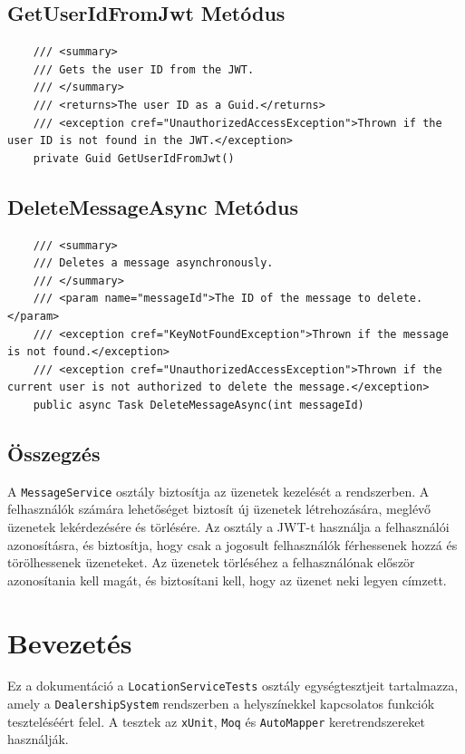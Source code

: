 \documentclass{report}[11pt]
\begin{document}
\subsection*{GetUserIdFromJwt Metódus}
\begin{lstlisting}
    /// <summary>
    /// Gets the user ID from the JWT.
    /// </summary>
    /// <returns>The user ID as a Guid.</returns>
    /// <exception cref="UnauthorizedAccessException">Thrown if the user ID is not found in the JWT.</exception>
    private Guid GetUserIdFromJwt()
\end{lstlisting}

\subsection*{DeleteMessageAsync Metódus}
\begin{lstlisting}
    /// <summary>
    /// Deletes a message asynchronously.
    /// </summary>
    /// <param name="messageId">The ID of the message to delete.</param>
    /// <exception cref="KeyNotFoundException">Thrown if the message is not found.</exception>
    /// <exception cref="UnauthorizedAccessException">Thrown if the current user is not authorized to delete the message.</exception>
    public async Task DeleteMessageAsync(int messageId)
\end{lstlisting}

\subsection*{Összegzés}
A \texttt{MessageService} osztály biztosítja az üzenetek kezelését a rendszerben. A felhasználók számára lehetőséget biztosít új üzenetek létrehozására, meglévő üzenetek lekérdezésére és törlésére. Az osztály a JWT-t használja a felhasználói azonosításra, és biztosítja, hogy csak a jogosult felhasználók férhessenek hozzá és törölhessenek üzeneteket. Az üzenetek törléséhez a felhasználónak először azonosítania kell magát, és biztosítani kell, hogy az üzenet neki legyen címzett.


\section{Bevezetés}
Ez a dokumentáció a \texttt{LocationServiceTests} osztály egységtesztjeit tartalmazza, amely a \texttt{DealershipSystem} rendszerben a helyszínekkel kapcsolatos funkciók teszteléséért felel. A tesztek az \texttt{xUnit}, \texttt{Moq} és \texttt{AutoMapper} keretrendszereket használják.
\end{document}

